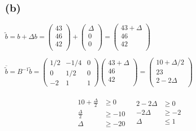 \documentclass{article}
\begin{document}
\subsection*{(b)}
\begin{center}
$\tilde{b}=b+\Delta b
=
\begin{pmatrix}
     43\\
     46\\
     42\\
   \end{pmatrix}
   +
   \begin{pmatrix}
     \Delta\\
     0\\
     0\\
   \end{pmatrix}
    =
    \begin{pmatrix}
     43+\Delta\\
     46\\
     42\\
   \end{pmatrix}$
   \\ 
   \vspace{5mm} %

   $\overline{\tilde{b}}=B^{-1}\tilde{b}
	=
	\begin{pmatrix}
      1/2 & -1/4 & 0\\
      0   & 1/2  & 0\\ 
      -2  & 1    & 1
   	\end{pmatrix}
    \begin{pmatrix}
     43+\Delta\\
     46\\
     42\\
   \end{pmatrix}
   =
   \begin{pmatrix}
     10+\Delta/2\\
     23\\
     2-2\Delta\\
   \end{pmatrix}$

\begin{spacing}{1.9}
   \begin{align*}
      \begin{matrix}
      \begin{aligned}
      10+ \frac{\Delta}{2} & \geq 0   \\
   		\frac{\Delta}{2} & \geq -10    \\
   		\Delta & \geq -20                     
      \end{aligned}
                                              &                                           
      \begin{aligned}
      2- 2\Delta & \geq 0   \\
   		-2\Delta & \geq -2    \\
   		\Delta & \leq 1                     
      \end{aligned}
      \end{matrix}
   \end{align*}
\end{spacing}


\end{center}
\end{document}
